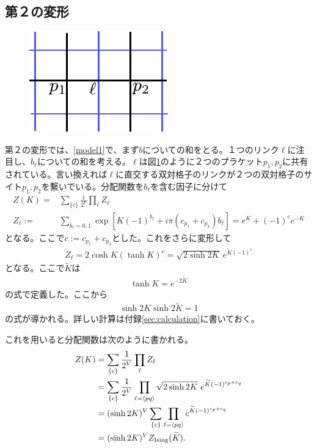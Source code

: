 \documentclass[a4paper,12pt,dvipdfmx]{jlreq}
\newcommand{\Kt}{\widetilde{K}}
\newcommand{\ZIs}{Z_{\mathrm{Ising}}}
\begin{document}
\subsection{第２の変形}
\label{sec:second}
\begin{figure}
  \centering
  \includegraphics{link_plaquette.pdf}
  \caption{{}}
  \label{fig:link_plaquette}
\end{figure}

第２の変形では、\eqref{model1}で、まず$b$についての和をとる。１つのリンク$\ell$に注目し、$b_{\ell}$についての和を考える。$\ell$は図\ref{fig:link_plaquette}のように２つのプラケット$p_1,p_2$に共有されている。言い換えれば$\ell$に直交する双対格子のリンクが２つの双対格子のサイト$p_1,p_2$を繋いでいる。分配関数を$b_{\ell}$を含む因子に分けて
\begin{align}
  Z(K)=&\sum_{\{c\}}\frac{1}{2^V}\prod_{\ell}Z_{\ell}\\
  Z_{\ell}:=&\sum_{b_{\ell}=0,1}\exp\left[
    K(-1)^{b_{\ell}}+i\pi (c_{p_1}+c_{p_2})b_{\ell}
  \right]
  =e^{K}+(-1)^{c}e^{-K}
\end{align}
となる。ここで$c:=c_{p_1}+c_{p_2}$とした。これをさらに変形して
\begin{align}
  Z_{\ell}=2\cosh K (\tanh K)^{c}
  =\sqrt{2\sinh 2K}\ e^{\Kt(-1)^c}\label{Zelltemp}
\end{align}
となる。ここで$\Kt$は
\begin{align}
  \tanh K = e^{-2\Kt}
\end{align}
の式で定義した。ここから
\begin{align}
  \sinh 2 K \sinh 2\Kt =1 \label{dualK}
\end{align}
の式が導かれる。詳しい計算は付録\ref{sec:calculation}に書いておく。

これを用いると分配関数は次のように書かれる。
\begin{align}
  Z(K)&=\sum_{\{c\}}\frac{1}{2^V}\prod_{\ell}Z_{\ell}\notag\\
  &=\sum_{\{c\}}\frac{1}{2^V}\prod_{\ell=\expval{pq}}\sqrt{2\sinh 2K}\ e^{\Kt(-1)^{c_p+c_q}}\notag\\
  &=(\sinh 2K)^{V}\sum_{\{c\}}\prod_{\ell=\expval{pq}} e^{\Kt(-1)^{c_p+c_q}}\notag\\
  &=(\sinh 2K)^{V}\ZIs(\Kt).
\end{align}
\end{document}
